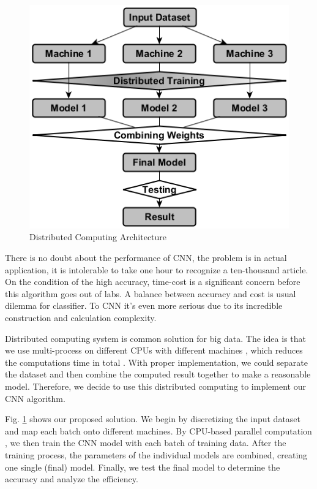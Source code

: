 \begin {figure}[t]
\centering
\includegraphics[width=0.90\columnwidth]{Paper_Fig1_DistCompArch.png}
\caption{Distributed Computing Architecture}
\label{Distributed Computing Architecture}
\end {figure}

There is no doubt about the performance of CNN, the problem is in actual application, it is intolerable to take one hour to recognize a ten-thousand article. On the condition of the high accuracy, time-cost is a significant concern before this algorithm goes out of labs. A balance between accuracy and cost is usual dilemma for classifier. To CNN it’s even more serious due to its incredible construction and calculation complexity.

Distributed computing system \cite{braun2001comparison}\cite{lawrence1997face} is common solution for big data. The idea is that we use multi-process on different CPUs with different machines \cite{morrison2005advancing}, which reduces the computations time in total \cite{lippmann1987introduction}. With proper implementation, we could separate the dataset and then combine the computed result together to make a reasonable model. Therefore, we decide to use this distributed computing to implement our CNN algorithm. 

Fig. \ref{Distributed Computing Architecture} shows our proposed solution. We begin by discretizing the input dataset and map each batch onto different machines. By CPU-based parallel computation \cite{li2013parameter}, we then train the CNN model with each batch of training data. After the training process, the parameters of the individual models are combined, creating one single (final) model. Finally, we test the final model to determine the accuracy and analyze the efficiency.


